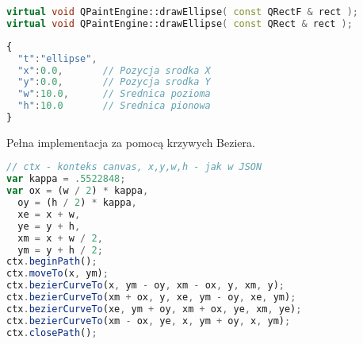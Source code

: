 \begin{lstlisting}[language=C++,numbers=none]
virtual void QPaintEngine::drawEllipse( const QRectF & rect );
virtual void QPaintEngine::drawEllipse( const QRect & rect );
\end{lstlisting}
\begin{lstlisting}[language=JavaScript,numbers=none]
{
  "t":"ellipse",
  "x":0.0,       // Pozycja srodka X
  "y":0.0,       // Pozycja srodka Y
  "w":10.0,      // Srednica pozioma
  "h":10.0       // Srednica pionowa
}
\end{lstlisting}

Pełna implementacja za pomocą krzywych Beziera.

\begin{lstlisting}[language=JavaScript,numbers=none,caption=Implementacja rysowania elips za pomocą krzywych Beziera wykorzystana w projekcie]
// ctx - konteks canvas, x,y,w,h - jak w JSON
var kappa = .5522848;
var ox = (w / 2) * kappa,
  oy = (h / 2) * kappa,
  xe = x + w,
  ye = y + h,
  xm = x + w / 2,
  ym = y + h / 2;
ctx.beginPath();
ctx.moveTo(x, ym);
ctx.bezierCurveTo(x, ym - oy, xm - ox, y, xm, y);
ctx.bezierCurveTo(xm + ox, y, xe, ym - oy, xe, ym);
ctx.bezierCurveTo(xe, ym + oy, xm + ox, ye, xm, ye);
ctx.bezierCurveTo(xm - ox, ye, x, ym + oy, x, ym);
ctx.closePath();
\end{lstlisting}